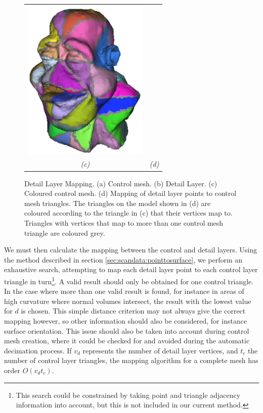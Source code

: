 \begin{figure}
\begin{center}
\begin{tabular}{cc}
\includegraphics[width=6cm]{../images/dinohead_mapflat} \\
{\it (c)} & {\it (d)}
\end{tabular}
\caption[Detail layer mapping]{\label{fig:detailmapping} Detail Layer Mapping. (a) Control mesh. (b) Detail Layer. (c) Coloured control mesh. (d) Mapping of detail layer points to control mesh triangles. The triangles on the model shown in (d) are coloured according to the triangle in (c) that their vertices map to. Triangles with vertices that map to more than one control mesh triangle are coloured grey. }
\end{center}
\end{figure}
We must then calculate the mapping between the control and detail layers. Using the method described in section \ref{sec:scandata:pointtosurface}, we perform an exhaustive search, attempting to map each detail layer point to each control layer triangle in turn\footnote{This search could be constrained by taking point and triangle adjacency information into account, but this is not included in our current method.}. A valid result should only be obtained for one control triangle. In the case where more than one valid result is found, for instance in areas of high curvature where normal volumes intersect, the result with the lowest value for $d$ is chosen. This simple distance criterion may not always give the correct mapping however, so other information should also be considered, for instance surface orientation. This issue should also be taken into account during control mesh creation, where it could be checked for and avoided during the automatic decimation process. If $v_d$ represents the number of detail layer vertices, and $t_c$ the number of control layer triangles, the mapping algorithm for a complete mesh has order $O(v_d t_c)$.

